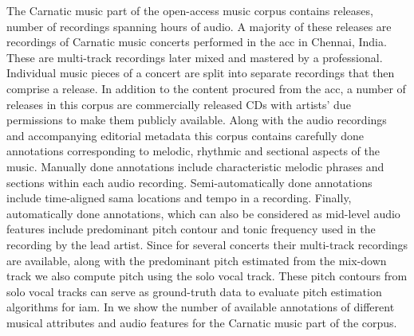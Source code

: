 
The Carnatic music part of the open-access music corpus contains  releases,  number of recordings spanning  hours of audio. A majority of these releases are recordings of Carnatic music concerts performed in the \gls{acc} in Chennai, India. These are multi-track recordings later mixed and mastered by a professional. Individual music pieces of a concert are split into separate recordings that then comprise a release. In addition to the content procured from the \gls{acc}, a number of releases in this corpus are commercially released CDs with artists' due permissions to make them publicly available. Along with the audio recordings and accompanying editorial metadata this corpus contains carefully done annotations corresponding to melodic, rhythmic and sectional aspects of the music. Manually done annotations include characteristic melodic phrases and sections within each audio recording. Semi-automatically done annotations include time-aligned sama locations and tempo in a recording. Finally, automatically done annotations, which can also be considered as mid-level audio features include predominant pitch contour and tonic frequency used in the recording by the lead artist. Since for several concerts their multi-track recordings are available, along with the predominant pitch estimated from the mix-down track we also compute pitch using the solo vocal track. These pitch contours from solo vocal tracks can serve as ground-truth data to evaluate pitch estimation algorithms for \gls{iam}. In  we show the number of available annotations of different musical attributes and audio features for the Carnatic music part of the corpus.



